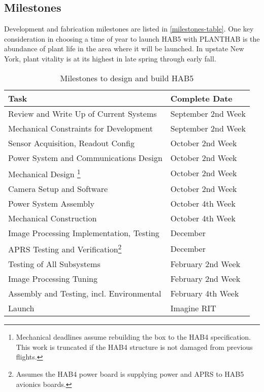 \documentclass[conference]{IEEEtran} %
\begin{document}
\subsection{Milestones}
Development and fabrication milestones are listed in \autoref{milestones-table}.
One key consideration in choosing a time of year to launch HAB5 with PLANTHAB is the abundance of plant life in the area where it will be launched.
In upstate New York, plant vitality is at its highest in late spring through early fall.

\begin{table}[!ht]
  \centering
  \caption{Milestones to design and build HAB5}

\begin{minipage}{.45\textwidth}
  \noindent
  \begin{tabular}{@{}ll@{}}

  \label{milestones-table}
    \textbf{Task} & \textbf{Complete Date} \\
    \midrule
    Review and Write Up of Current Systems & September 2nd Week \\
    Mechanical Constraints for Development & September 2nd Week \\ 
    Sensor Acquisition, Readout Config & October 2nd Week \\
    Power System and Communications Design & October 2nd Week \\
    Mechanical Design \footnote{Mechanical deadlines assume rebuilding the box to the HAB4 specification. This work is truncated if the HAB4 structure is not damaged from previous flights.} & October 2nd Week \\
    Camera Setup and Software & October 2nd Week \\
    Power System Assembly & October 4th Week \\
    Mechanical Construction & October 4th Week \\
    Image Processing Implementation, Testing & December \\
    APRS Testing and Verification\footnote{Assumes the HAB4 power board is supplying power and APRS to HAB5 avionics boards.} & December \\
    Testing of All Subsystems & February 2nd Week \\
    Image Processing Tuning & February 2nd Week \\
    Assembly and Testing, incl. Environmental & February 4th Week \\
    Launch & Imagine RIT \\
  \end{tabular}
\end{minipage}
\end{table}
\end{document}
